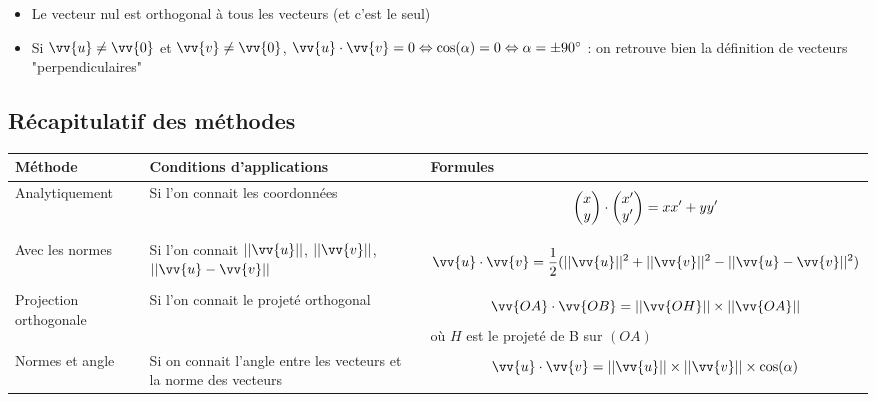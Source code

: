 \begin{remarques}
\begin{itemize}
\item Le vecteur nul est orthogonal à tous les vecteurs (et c'est le seul)
\item Si $\vv{u}\neq \vv{0}$ et  $\vv{v}\neq \vv{0}$, $\vv{u}\cdot\vv{v} = 0 \Leftrightarrow \cos(\alpha) = 0 \Leftrightarrow \alpha = \pm 90^{\circ}$ : on retrouve bien la définition de vecteurs "perpendiculaires"
\end{itemize}
\end{remarques}
\subsection{Récapitulatif des méthodes}
\begin{tabularx}{\linewidth}{| X | X | X |}
\hline
Méthode & Conditions d'applications & Formules\\ \hline
Analytiquement & Si l'on connait les coordonnées & $$\begin{pmatrix}x \\y \end{pmatrix} \cdot \begin{pmatrix}x' \\y' \end{pmatrix} = xx'+yy'$$\\ \hline
Avec les normes & Si l'on connait $||\vv{u}||$, $||\vv{v}||$, $||\vv{u} - \vv{v}||$ & $$\vv{u}\cdot\vv{v} = \dfrac{1}{2}(||\vv{u}||^2 + ||\vv{v}||^2 - ||\vv{u} - \vv{v}||^2)$$ \\ \hline
Projection orthogonale & Si l'on connait le projeté orthogonal & $$\vv{OA}\cdot\vv{OB} = ||\vv{OH}|| \times ||\vv{OA}||$$ où $H$ est le projeté de B sur $(OA)$\\ \hline 
Normes et angle & Si on connait l'angle entre les vecteurs et la norme des vecteurs & $$\vv{u}\cdot\vv{v} = ||\vv{u}|| \times ||\vv{v}|| \times \cos(\alpha)$$ \\ \hline
\end{tabularx}


